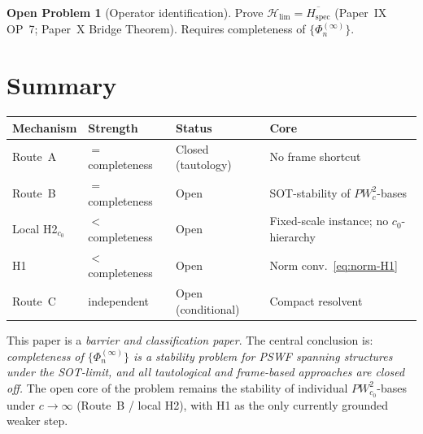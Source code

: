 \documentclass[12pt,a4paper]{amsart}
\theoremstyle{definition}
\newtheorem{problem}[theorem]{Open Problem}
\theoremstyle{remark}
\newcommand{\Hlim}{\mathcal{H}_{\lim}}
\newcommand{\Phiinf}[1]{\Phi_{#1}^{(\infty)}}
\newcommand{\PW}{PW}
\begin{document}
\begin{problem}[Operator identification]
\label{prob:bridge}
Prove $\Hlim = \overline{H_{\mathrm{spec}}}$
(Paper~IX OP~7; Paper~X Bridge Theorem).
Requires completeness of $\{\Phiinf{n}\}$.
\end{problem}

\section{Summary}
\label{sec:summary}

\medskip
\begin{center}
\renewcommand{\arraystretch}{1.3}
\begin{tabular}{lllp{3.5cm}}
\toprule
Mechanism & Strength & Status & Core \\
\midrule
Route~A & $=$ completeness
  & Closed (tautology)
  & No frame shortcut \\
Route~B & $=$ completeness
  & Open
  & SOT-stability of $\PW_c^2$-bases \\
Local H2$_{c_0}$ & $<$ completeness
  & Open
  & Fixed-scale instance; no $c_0$-hierarchy \\
H1 & $<$ completeness
  & Open
  & Norm conv.\ \eqref{eq:norm-H1} \\
Route~C & independent
  & Open (conditional)
  & Compact resolvent \\
\bottomrule
\end{tabular}
\end{center}

\medskip
\noindent
This paper is a \emph{barrier and classification paper}.
The central conclusion is:
\emph{completeness of $\{\Phiinf{n}\}$ is a stability
problem for PSWF spanning structures under the
SOT-limit, and all tautological and frame-based
approaches are closed off.}
The open core of the problem remains the stability
of individual $\PW_{c_0}^2$-bases under
$c\to\infty$ (Route~B / local H2),
with H1 as the only currently grounded weaker step.
\end{document}
